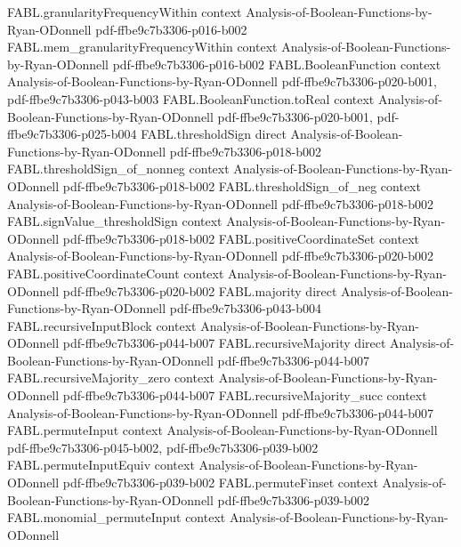 \begin{theorem}
  {FABL.granularityFrequencyWithin}
  {context}
  {Analysis-of-Boolean-Functions-by-Ryan-ODonnell}
  {pdf-ffbe9c7b3306-p016-b002}
\proofstep
  {FABL.mem_granularityFrequencyWithin}
  {context}
  {Analysis-of-Boolean-Functions-by-Ryan-ODonnell}
  {pdf-ffbe9c7b3306-p016-b002}
\proofstep
  {FABL.BooleanFunction}
  {context}
  {Analysis-of-Boolean-Functions-by-Ryan-ODonnell}
  {pdf-ffbe9c7b3306-p020-b001,
    pdf-ffbe9c7b3306-p043-b003}
\proofstep
  {FABL.BooleanFunction.toReal}
  {context}
  {Analysis-of-Boolean-Functions-by-Ryan-ODonnell}
  {pdf-ffbe9c7b3306-p020-b001,
    pdf-ffbe9c7b3306-p025-b004}
\proofstep
  {FABL.thresholdSign}
  {direct}
  {Analysis-of-Boolean-Functions-by-Ryan-ODonnell}
  {pdf-ffbe9c7b3306-p018-b002}
\proofstep
  {FABL.thresholdSign_of_nonneg}
  {context}
  {Analysis-of-Boolean-Functions-by-Ryan-ODonnell}
  {pdf-ffbe9c7b3306-p018-b002}
\proofstep
  {FABL.thresholdSign_of_neg}
  {context}
  {Analysis-of-Boolean-Functions-by-Ryan-ODonnell}
  {pdf-ffbe9c7b3306-p018-b002}
\proofstep
  {FABL.signValue_thresholdSign}
  {context}
  {Analysis-of-Boolean-Functions-by-Ryan-ODonnell}
  {pdf-ffbe9c7b3306-p018-b002}
\proofstep
  {FABL.positiveCoordinateSet}
  {context}
  {Analysis-of-Boolean-Functions-by-Ryan-ODonnell}
  {pdf-ffbe9c7b3306-p020-b002}
\proofstep
  {FABL.positiveCoordinateCount}
  {context}
  {Analysis-of-Boolean-Functions-by-Ryan-ODonnell}
  {pdf-ffbe9c7b3306-p020-b002}
\proofstep
  {FABL.majority}
  {direct}
  {Analysis-of-Boolean-Functions-by-Ryan-ODonnell}
  {pdf-ffbe9c7b3306-p043-b004}
\proofstep
  {FABL.recursiveInputBlock}
  {context}
  {Analysis-of-Boolean-Functions-by-Ryan-ODonnell}
  {pdf-ffbe9c7b3306-p044-b007}
\proofstep
  {FABL.recursiveMajority}
  {direct}
  {Analysis-of-Boolean-Functions-by-Ryan-ODonnell}
  {pdf-ffbe9c7b3306-p044-b007}
\proofstep
  {FABL.recursiveMajority_zero}
  {context}
  {Analysis-of-Boolean-Functions-by-Ryan-ODonnell}
  {pdf-ffbe9c7b3306-p044-b007}
\proofstep
  {FABL.recursiveMajority_succ}
  {context}
  {Analysis-of-Boolean-Functions-by-Ryan-ODonnell}
  {pdf-ffbe9c7b3306-p044-b007}
\proofstep
  {FABL.permuteInput}
  {context}
  {Analysis-of-Boolean-Functions-by-Ryan-ODonnell}
  {pdf-ffbe9c7b3306-p045-b002,
    pdf-ffbe9c7b3306-p039-b002}
\proofstep
  {FABL.permuteInputEquiv}
  {context}
  {Analysis-of-Boolean-Functions-by-Ryan-ODonnell}
  {pdf-ffbe9c7b3306-p039-b002}
\proofstep
  {FABL.permuteFinset}
  {context}
  {Analysis-of-Boolean-Functions-by-Ryan-ODonnell}
  {pdf-ffbe9c7b3306-p039-b002}
\proofstep
  {FABL.monomial_permuteInput}
  {context}
  {Analysis-of-Boolean-Functions-by-Ryan-ODonnell}

\end{theorem}
